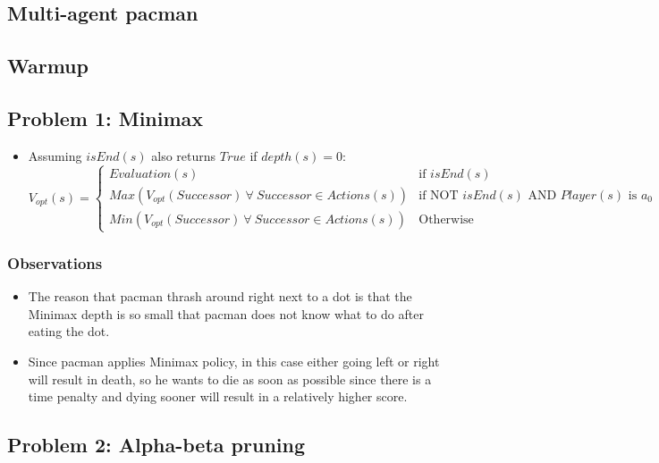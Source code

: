 \documentclass[11pt]{article}
\begin{document}
\begin{onehalfspace}
\section{Multi-agent pacman}
\subsection{Warmup}
\subsection{Problem 1: Minimax}
\begin{itemize}
\item
Assuming $isEnd(s)$ also returns $True$ if $depth(s) = 0$:
\[
    V_{opt}(s)=
    \begin{cases}
    Evaluation(s) & \text{if } isEnd(s)\\
    Max(V_{opt}(Successor)\: \forall \: Successor \in Actions(s)) & \text{if NOT } isEnd(s) \text{ AND } Player(s) \text{ is } a_0\\ 
    Min(V_{opt}(Successor)\: \forall \: Successor \in Actions(s)) & \text{Otherwise}
    \end{cases}
\]
\end{itemize}
\subsubsection{Observations}
\begin{itemize}
\item
The reason that pacman thrash around right next to a dot is that the Minimax depth is so small that pacman does not know what to do after eating the dot.\\
\item
Since pacman applies Minimax policy, in this case either going left or right will result in death, so he wants to die as soon as possible since there is a time penalty and dying sooner will result in a relatively higher score.\\
\end{itemize}
\subsection{Problem 2: Alpha-beta pruning}

\end{onehalfspace}
\end{document}
